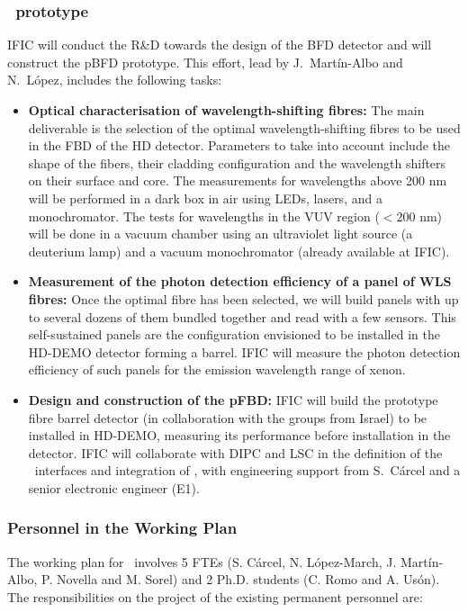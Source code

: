 \subsubsection*{\HDEMO\ prototype}


IFIC will conduct the R\&D towards the design of the BFD detector and will construct the pBFD prototype. This effort, lead by J.~Mart\'in-Albo and N.~L\'opez, includes the following  tasks:
\begin{itemize}[noitemsep,topsep=0pt,parsep=0pt,partopsep=0pt]
    \item \textbf{Optical characterisation of wavelength-shifting fibres:} The main deliverable is the selection of the optimal wavelength-shifting fibres to be used in the FBD of the HD detector. Parameters to take into account include the shape of the fibers, their cladding configuration and the wavelength shifters on their surface and core. The measurements for wavelengths above 200 nm will be performed in a dark box in air using LEDs, lasers, and  a monochromator. The tests for wavelengths in the VUV region ($<200$ nm) will be done in a vacuum chamber using an ultraviolet light source (a deuterium lamp) and a vacuum monochromator (already available at IFIC).
    \item \textbf{Measurement of the photon detection efficiency of a panel of WLS fibres:} Once the optimal fibre has been selected, we will build panels with up to several dozens of them bundled together and read with a few sensors. This self-sustained panels are the configuration envisioned to be installed in the HD-DEMO detector forming a barrel. IFIC will measure the photon detection efficiency of such panels for the emission wavelength range of xenon. 
    \item \textbf{Design and construction of the pFBD:} IFIC will build the prototype fibre barrel detector (in collaboration with the groups from Israel) to be installed in HD-DEMO, measuring its performance before installation in the detector. IFIC will collaborate with DIPC and LSC in the definition of the \NHD\ interfaces and integration of \NHD, with engineering support from S.~Cárcel and a senior electronic engineer (E1).
\end{itemize}
 

\subsubsection*{Personnel in the Working Plan}
The working plan for \sIFIC\ involves 5 FTEs (S. C\'arcel, N. L\'opez-March, J. Mart\'in-Albo, P. Novella and M. Sorel) and 2 Ph.D. students (C. Romo and A. Us\'on). The responsibilities on the project of the existing permanent personnel are:

